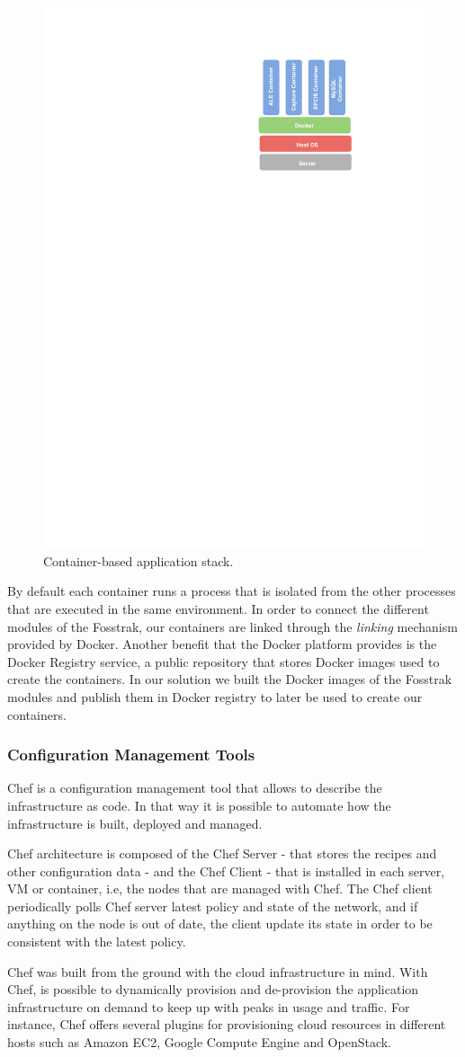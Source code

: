 \begin{figure}[!h]
  \centering
  \includegraphics[width=.45\textwidth]{images/docker-stack}
  \caption{Container-based application stack.}
  \label{fig:docker_stack}
\end{figure}

By default each container runs a process that is isolated from the other processes that are executed in
the same environment. In order to connect the different modules of the Fosstrak, our containers are
linked through the \textit{linking} mechanism provided by Docker. Another benefit that the Docker platform
provides is the Docker Registry service, a public repository that stores Docker images used to create the
containers. In our solution we built the Docker images of the Fosstrak modules and publish them
in Docker registry to later be used to create our containers.
\subsubsection{Configuration Management Tools}
\label{subs:cm_tools}
Chef is a configuration management tool that allows to describe the infrastructure as code. In that way
it is possible to automate how the infrastructure is built, deployed and managed.

Chef architecture is composed of the Chef Server - that stores the recipes and other configuration data -
and the  Chef Client - that is installed in each server, VM or container, i.e, the nodes that are managed with Chef.
The Chef client periodically polls Chef server latest policy and state of the network, and if anything on the
node is out of date, the client update its state in order to be consistent with the latest policy.

Chef was built from the ground with the cloud infrastructure in mind. With Chef, is possible to dynamically
provision and de-provision the application infrastructure on demand to keep up with peaks in usage and traffic.
For instance, Chef offers several plugins for provisioning cloud resources in different hosts such as
Amazon EC2, Google Compute Engine and OpenStack.
